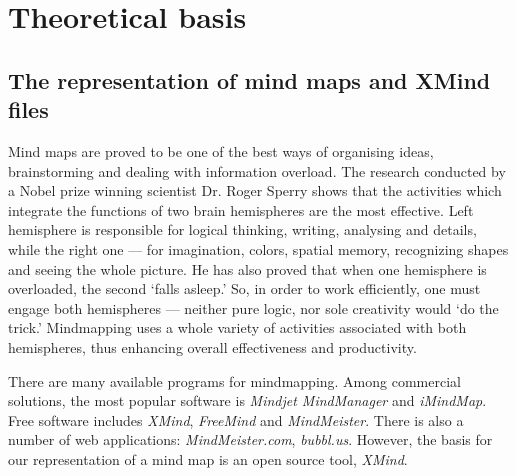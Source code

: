 %
%
%
%
%

\chapter{Theoretical basis}
\label{chap:theory}

\section{The representation of mind maps and XMind files}
\label{sec:xmind}

Mind maps are proved to be one of the best ways of organising ideas, brainstorming and dealing with information overload. The research conducted by a Nobel prize winning scientist Dr. Roger Sperry shows that the activities which integrate the functions of two brain hemispheres are the most effective. \cite{Voneida:1998:Sperry} Left hemisphere is responsible for logical thinking, writing, analysing and details, while the right one --- for imagination, colors, spatial memory, recognizing shapes and seeing the whole picture. He has also proved that when one hemisphere is overloaded, the second `falls asleep.' So, in order to work efficiently, one must engage both hemispheres --- neither pure logic, nor sole creativity would `do the trick.' Mindmapping uses a whole variety of activities associated with both hemispheres, thus enhancing overall effectiveness and productivity.

There are many available programs for mindmapping. Among commercial solutions, the most popular software is {\em Mindjet MindManager} and {\em iMindMap}. Free software includes {\em XMind}, {\em FreeMind} and \emph{MindMeister}. \cite{Wiki:Software} There is also a number of web applications: \emph{MindMeister.com}, \emph{bubbl.us}. However, the basis for our representation of a mind map is an open source tool, {\em XMind}.

